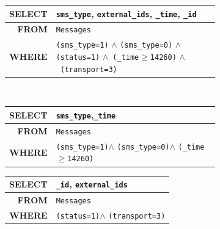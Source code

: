  \begin{figure}
  \centering
 \begin{subfigure}{\columnwidth}
   {\small
     \begin{tabular}{r|p{60mm}}
     \textbf{SELECT} & 
         \texttt{sms\_type},
         \textcolor{light-gray}{\texttt{external\_ids}},
         \texttt{\_time},
         \texttt{\_id}\\ \hline
     \textbf{FROM} &
         \texttt{Messages}\\ \hline
     \textbf{WHERE} &
         \texttt{(sms\_type=1)} $\wedge$
         \textcolor{mid-gray}{\texttt{(sms\_type=0)}} $\wedge$
         \texttt{(status=1)}   
         $\wedge$~\textcolor{light-gray}{\texttt{(\_time$\geq$14260)}} $\wedge$~\texttt{(transport=3)} 
     \end{tabular}
   }
   \label{fig:parentlevel}
 \end{subfigure}\\[2mm]
 \begin{subfigure}{\columnwidth}
 \hspace*{-1mm}
   {\small
     \centering
     \begin{tabular}{r|p{20mm}}
     \textbf{SELECT} & 
         \texttt{sms\_type},\texttt{\_time}
         \\ \hline
     \textbf{FROM} &
         \texttt{Messages}\\ \hline
     \textbf{WHERE} &
         \texttt{(sms\_type=1)}$\wedge$ 
         \textcolor{mid-gray}{\texttt{(sms\_type=0)}}$\wedge$
         \textcolor{light-gray}{\texttt{(\_time$\geq$14260)}}  
     \end{tabular}
     \begin{tabular}{r|p{20mm}}
     \textbf{SELECT} & 
         \texttt{\_id}, \textcolor{light-gray}{\texttt{external\_ids}}
         \\ \hline
     \textbf{FROM} &
         \texttt{Messages}\\ \hline
     \textbf{WHERE} &
         \texttt{(status=1)}$\wedge$
         \texttt{(transport=3)} 
     \end{tabular}
   }
   \label{fig:childlevel}  
 \end{subfigure}\\[2mm]
 \label{fig:hierarchicalnaivemixtureencoding}
 \trimfigurewhitespace
 \end{figure}

